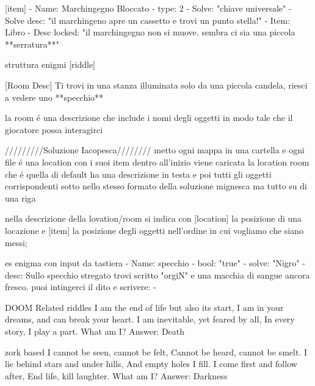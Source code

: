[item]
  - Name: Marchingegno Bloccato
  - type: 2
  - Solve: "chiave universale"
  - Solve desc: "il marchingeno apre un cassetto e trovi un punto stella!"
  - Item: Libro
  - Desc locked: "il marchingegno non si muove. sembra ci sia una piccola **serratura**"

struttura enigmi
[riddle]



[Room Desc]
Ti trovi in una stanza illuminata solo da una piccola candela, riesci a vedere uno **specchio** 


la room é una descrizione che include i nomi degli oggetti in modo tale che il giocatore possa interagirci

/////////Soluzione Iacopesca//////// 
metto ogni mappa in una cartella e ogni file é una location con i suoi item dentro
all'inizio viene caricata la location room che é quella di default
ha una descrizione in testa e poi tutti gli oggetti corrispondenti sotto
nello stesso formato della soluzione mignesca ma tutto su di una riga

nella descrizione della lovation/room si indica con [location] la posizione di una locazione
e [item] la posizione degli oggetti nell'ordine in cui vogliamo che siano messi;




es enigma con input da tastiera 
 - Name: specchio
 - bool: "true"
 - solve: "Nigro"
 - desc: Sullo specchio stregato trovi scritto "orgiN" e una macchia di sangue ancora fresco. puoi intingerci
    il dito e scrivere: 
 - 

DOOM Related riddles
I am the end of life but also its start,
I am in your dreams, and can break your heart.
I am inevitable, yet feared by all,
In every story, I play a part.
What am I?
Answer: Death


zork based
I cannot be seen, cannot be felt,
Cannot be heard, cannot be smelt.
I lie behind stars and under hills,
And empty holes I fill.
I come first and follow after,
End life, kill laughter.
What am I?
Answer: Darkness


